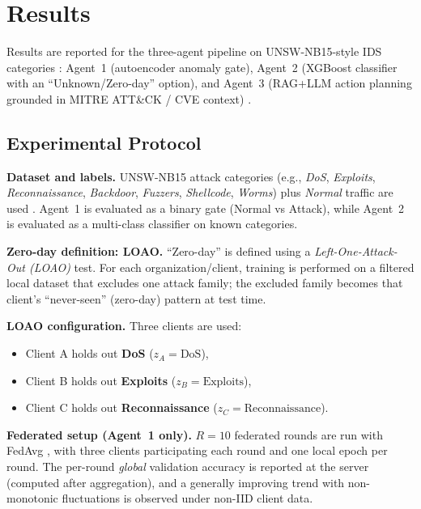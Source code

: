 \documentclass[conference]{IEEEtran}
\begin{document}


\section{Results}
\label{sec:results}

Results are reported for the three-agent pipeline on UNSW-NB15-style IDS categories \cite{Moustafa2015UNSW}: Agent~1 (autoencoder anomaly gate), Agent~2 (XGBoost classifier with an ``Unknown/Zero-day'' option), and Agent~3 (RAG+LLM action planning grounded in MITRE ATT\&CK / CVE context) \cite{Chen2016XGBoost,Lewis2020RAG,MITREATTACK}.



\subsection{Experimental Protocol}
\label{sec:protocol}

\textbf{Dataset and labels.} UNSW-NB15 attack categories (e.g., \emph{DoS}, \emph{Exploits}, \emph{Reconnaissance}, \emph{Backdoor}, \emph{Fuzzers}, \emph{Shellcode}, \emph{Worms}) plus \emph{Normal} traffic are used \cite{Moustafa2015UNSW}. Agent~1 is evaluated as a binary gate (Normal vs Attack), while Agent~2 is evaluated as a multi-class classifier on known categories.

\textbf{Zero-day definition: LOAO.} ``Zero-day'' is defined using a \emph{Left-One-Attack-Out (LOAO)} test. For each organization/client, training is performed on a filtered local dataset that excludes one attack family; the excluded family becomes that client’s ``never-seen'' (zero-day) pattern at test time.

\textbf{LOAO configuration.} Three clients are used:
\begin{itemize}
  \item Client A holds out \textbf{DoS} ($z_A=\text{DoS}$),
  \item Client B holds out \textbf{Exploits} ($z_B=\text{Exploits}$),
  \item Client C holds out \textbf{Reconnaissance} ($z_C=\text{Reconnaissance}$).
\end{itemize}

\textbf{Federated setup (Agent~1 only).} $R=10$ federated rounds are run with FedAvg \cite{mcmahan2017fedavg}, with three clients participating each round and one local epoch per round. The per-round \emph{global} validation accuracy is reported at the server (computed after aggregation), and a generally improving trend with non-monotonic fluctuations is observed under non-IID client data.
\end{document}
